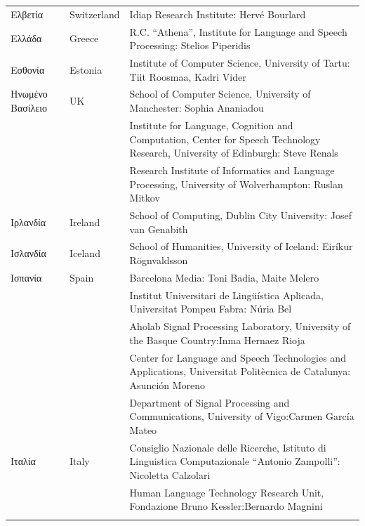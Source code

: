 \documentclass[]{../../metanetpaper}
\begin{document}
\begin{longtable}{@{}llp{113mm}@{}}
  Ελβετία & \textcolor{grey1}{Switzerland} & Idiap Research Institute: Hervé Bourlard \\ \addlinespace 
  Ελλάδα & \textcolor{grey1}{Greece} & R.C. “Athena”, Institute for Language and Speech Processing: Stelios Piperidis\\ \addlinespace
  Εσθονία & \textcolor{grey1}{Estonia} & Institute of Computer Science, University of Tartu: Tiit Roosmaa, Kadri Vider\\ \addlinespace
  Ηνωμένο Βασίλειο & \textcolor{grey1}{UK} & School of Computer Science, University of Manchester: Sophia Ananiadou \\ \addlinespace 
  & & Institute for Language, Cognition and Computation, Center for Speech Technology Research, University of Edinburgh: Steve Renals \\ \addlinespace 
  & & Research Institute of Informatics and Language Processing, University of Wolverhampton: Ruslan Mitkov \\ \addlinespace 
  Ιρλανδία & \textcolor{grey1}{Ireland} & School of Computing, Dublin City University: Josef van Genabith\\ \addlinespace
  Ισλανδία & \textcolor{grey1}{Iceland} & School of Humanities, University of Iceland: Eiríkur Rögnvaldsson\\ \addlinespace
  Ισπανία & \textcolor{grey1}{Spain} & Barcelona Media: Toni Badia, Maite Melero \\ \addlinespace 
  & & Institut Universitari de Lingüística Aplicada, Universitat Pompeu Fabra: Núria Bel \\ \addlinespace 
  & & Aholab Signal Processing Laboratory, University of the Basque Country:\newline Inma Hernaez Rioja \\ \addlinespace 
  & & Center for Language and Speech Technologies and Applications, Universitat Politècnica de Catalunya:  Asunción Moreno \\ \addlinespace 
  & & Department of Signal Processing and Communications, University of Vigo:\newline Carmen García Mateo \\ \addlinespace 
  Ιταλία & \textcolor{grey1}{Italy} & Consiglio Nazionale delle Ricerche, Istituto di Linguistica Computazionale “Antonio Zampolli”: Nicoletta Calzolari\\ \addlinespace
  & & Human Language Technology Research Unit, Fondazione Bruno Kessler:\newline Bernardo Magnini\\ \addlinespace 

\end{longtable}
\end{document}
